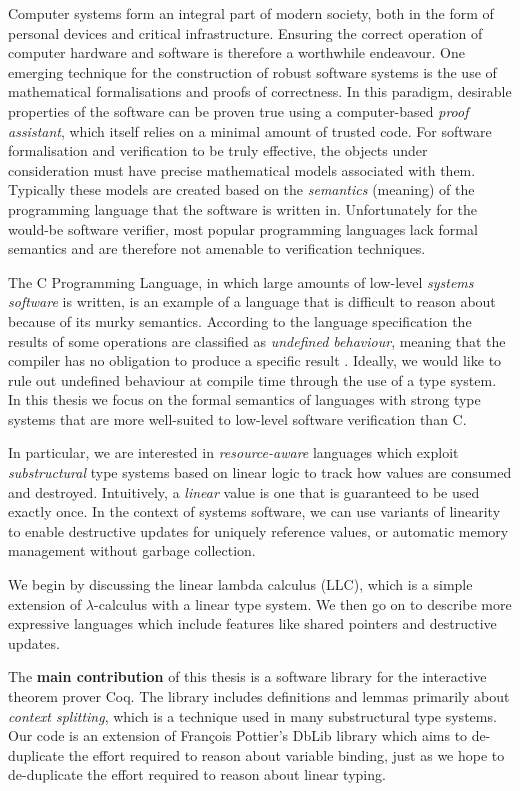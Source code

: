 \documentclass[]{unswthesis}
\newcommand{\Francois}{Fran\frenchc{c}ois }
\let\frenchc\c
\let\c\texttt
\let\i\textit
\let\b\textbf
\begin{document}
Computer systems form an integral part of modern society, both in the form of personal devices and critical infrastructure. Ensuring the correct operation of computer hardware and software is therefore a worthwhile endeavour. One emerging technique for the construction of robust software systems is the use of mathematical formalisations and proofs of correctness. In this paradigm, desirable properties of the software can be proven true using a computer-based \i{proof assistant}, which itself relies on a minimal amount of trusted code. For software formalisation and verification to be truly effective, the objects under consideration must have precise mathematical models associated with them. Typically these models are created based on the \i{semantics} (meaning) of the programming language that the software is written in. Unfortunately for the would-be software verifier, most popular programming languages lack formal semantics and are therefore not amenable to verification techniques.

The C Programming Language, in which large amounts of low-level \i{systems software} is written, is an example of a language that is difficult to reason about because of its murky semantics. According to the language specification the results of some operations are classified as \i{undefined behaviour}, meaning that the compiler has no obligation to produce a specific result \cite{isoc}. Ideally, we would like to rule out undefined behaviour at compile time through the use of a type system. In this thesis we focus on the formal semantics of languages with strong type systems that are more well-suited to low-level software verification than C.

In particular, we are interested in \i{resource-aware} languages which exploit \i{substructural} type systems based on linear logic \cite{girard87} to track how values are consumed and destroyed. Intuitively, a \i{linear} value is one that is guaranteed to be used exactly once. In the context of systems software, we can use variants of linearity to enable destructive updates for uniquely reference values, or automatic memory management without garbage collection.

We begin by discussing the linear lambda calculus (LLC), which is a simple extension of $\lambda$-calculus with a linear type system. We then go on to describe more expressive languages which include features like shared pointers and destructive updates.

The \b{main contribution} of this thesis is a software library for the interactive theorem prover Coq. The library includes definitions and lemmas primarily about \i{context splitting}, which is a technique used in many substructural type systems. Our code is an extension of \Francois Pottier's DbLib library which aims to de-duplicate the effort required to reason about variable binding, just as we hope to de-duplicate the effort required to reason about linear typing.
\end{document}
